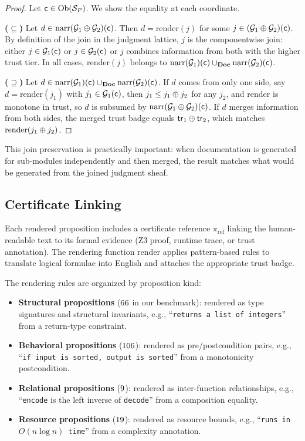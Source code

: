 \documentclass[11pt]{article}
\newcommand{\CertRef}{\pi_{\mathrm{ref}}}
\newcommand{\NarrFunc}{\mathrm{narr}}
\newcommand{\RenderFunc}{\mathrm{render}}
\newcommand{\tr}{\mathsf{tr}}                        %
\newcommand{\DocCat}{\mathbf{Doc}}                    %
\begin{document}
\begin{proof}
Let $\mathsf{c} \in \mathrm{Ob}(\mathcal{S}_P)$.  We show the equality at each
coordinate.

\textbf{($\subseteq$)}
Let $d \in \NarrFunc(\mathcal{G}_1 \tjoin \mathcal{G}_2)(\coord)$.
Then $d = \RenderFunc(j)$ for some $j \in (\mathcal{G}_1 \oplus
\mathcal{G}_2)(\mathsf{c})$.  By definition of the join in the judgment
lattice, $j$ is the componentwise join: either $j \in \mathcal{G}_1
(\mathsf{c})$ or $j \in \mathcal{G}_2(\mathsf{c})$ or $j$ combines information
from both with the higher trust tier.  In all cases, $\RenderFunc(j)$
belongs to $\NarrFunc(\mathcal{G}_1)(\coord) \cup_{\DocCat}
\NarrFunc(\mathcal{G}_2)(\coord)$.

\textbf{($\supseteq$)}
Let $d \in \NarrFunc(\mathcal{G}_1)(\coord) \cup_{\DocCat}
\NarrFunc(\mathcal{G}_2)(\coord)$.  If $d$ comes from only one side,
say $d = \RenderFunc(j_1)$ with $j_1 \in \mathcal{G}_1(\mathsf{c})$, then
$j_1 \leq j_1 \oplus j_2$ for any $j_2$, and $\RenderFunc$ is
monotone in trust, so $d$ is subsumed by $\NarrFunc(\mathcal{G}_1
\tjoin \mathcal{G}_2)(\coord)$.  If $d$ merges information from both
sides, the merged trust badge equals $\tr_1 \tjoin \tr_2$, which
matches $\RenderFunc(j_1 \tjoin j_2)$.
\end{proof}

This join preservation is practically important: when documentation is
generated for sub-modules independently and then merged, the result
matches what would be generated from the joined judgment sheaf.

\subsection{Certificate Linking}
Each rendered proposition includes a certificate reference $\CertRef$
linking the human-readable text to its formal evidence (Z3 proof,
runtime trace, or trust annotation).  The rendering function $\RenderFunc$
applies pattern-based rules to translate logical formulae into English
and attaches the appropriate trust badge.

The rendering rules are organized by proposition kind:
\begin{itemize}[noitemsep]
\item \textbf{Structural propositions} ($66$ in our
  benchmark): rendered as type signatures and structural invariants,
  e.g., ``\texttt{returns a list of integers}'' from a return-type
  constraint.
\item \textbf{Behavioral propositions} ($106$):
  rendered as pre/postcondition pairs, e.g., ``\texttt{if input is
  sorted, output is sorted}'' from a monotonicity postcondition.
\item \textbf{Relational propositions} ($9$):
  rendered as inter-function relationships, e.g., ``\texttt{encode}
  is the left inverse of \texttt{decode}'' from a composition
  equality.
\item \textbf{Resource propositions} ($19$): rendered
  as resource bounds, e.g., ``\texttt{runs in $O(n \log n)$ time}''
  from a complexity annotation.
\end{itemize}
\end{document}
